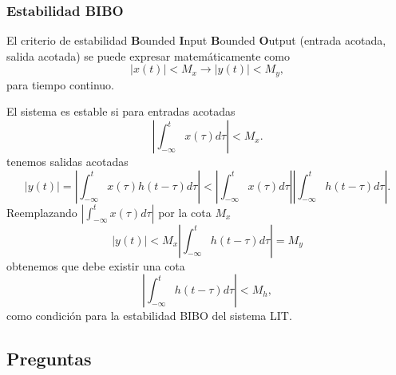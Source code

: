 \subsubsection{Estabilidad BIBO}

El criterio de estabilidad \textbf{B}ounded \textbf{I}nput \textbf{B}ounded \textbf{O}utput 
(entrada acotada, salida acotada) se puede expresar matem\'{a}ticamente como 
\begin{equation}
        \left| x\left( t\right) \right| < M_{x} \rightarrow \left| y\left( t\right)\right| <M_{y},
\end{equation}
para tiempo continuo.

El sistema es estable si para entradas acotadas 
\begin{equation}
        \left| \int_{-\infty}^{t}x\left( \tau \right) d\tau \right| < M_{x}.
\end{equation}
tenemos salidas acotadas 
\begin{equation}
        \left| y\left( t\right) \right| =
            \left| \int_{-\infty }^{t}x\left( \tau\right) h\left( t-\tau \right) d\tau \right| <
            \left| \int_{-\infty}^{t}x\left( \tau \right) d\tau \right| 
            \left| \int_{-\infty }^{t}h\left(t-\tau \right) d\tau \right| .
\end{equation}
Reemplazando $\left| \int_{-\infty}^{t}x\left( \tau \right) d\tau \right|$ por la cota $M_{x}$
\begin{equation}
    \left| y\left( t\right) \right| < M_{x}\left| \int_{-\infty }^{t}h\left(t-\tau \right) d\tau \right| = M_{y}
\end{equation}
obtenemos que debe existir una cota
\begin{equation}
       \left| \int_{-\infty }^{t}h\left( t-\tau \right) d\tau \right| < M_{h},
\end{equation}
como condición para la estabilidad BIBO del sistema LIT.

\subsection{Preguntas}


